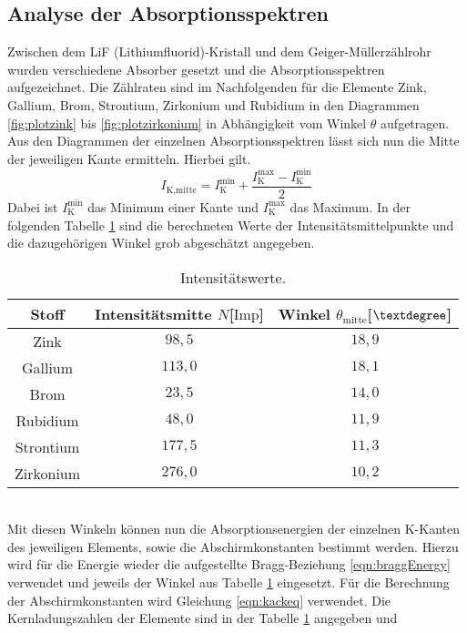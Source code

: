 \subsection{Analyse der Absorptionsspektren}
Zwischen dem LiF (Lithiumfluorid)-Kristall und dem Geiger-Müllerzählrohr wurden verschiedene Absorber gesetzt und die Absorptionsspektren aufgezeichnet.
Die Zählraten sind im Nachfolgenden für die Elemente Zink, Gallium, Brom, Strontium, Zirkonium und Rubidium in den Diagrammen \ref{fig:plotzink} bis \ref{fig:plotzirkonium} in Abhängigkeit vom 
Winkel $\theta$ aufgetragen.
Aus den Diagrammen der einzelnen Absorptionsspektren lässt sich nun die Mitte der jeweiligen Kante ermitteln.
Hierbei gilt.
\begin{equation*}
I_{\text{K,mitte}} = I_{\text{K}}^{\text{min}} + \frac{I_{\text{K}}^{\text{max}} - I_{\text{K}}^{\text{min}}}{2}
\end{equation*}
Dabei ist $I_{\text{K}}^{\text{min}}$ das Minimum einer Kante und $I_{\text{K}}^{\text{max}}$ das Maximum.
In der folgenden Tabelle \ref{tab:whatever} sind die berechneten Werte der Intensitätsmittelpunkte und die dazugehörigen Winkel grob abgeschätzt angegeben.
\begin{table}
\centering
\caption{Intensitätswerte.}
\label{tab:whatever}
\begin{tabular}{c c c}
    \toprule
    Stoff & Intensitätsmitte $N$[$\text{Imp}$] & Winkel $\theta_{\text{mitte}}$[$\textdegree$]\\
    \midrule
    Zink       &  $98{,5}$ & $18{,}9$ \\
    Gallium    &  $113{,}0$ & $18{,}1$ \\
    Brom          & $23{,}5$ & $14{,}0$ \\
     Rubidium     & $48{,}0$ & $11{,}9$ \\
      Strontium   & $177{,}5$ & $11{,}3$ \\
       Zirkonium  & $276{,}0$ & $10{,}2$ \\
    \bottomrule
\end{tabular}
\end{table}
\\
\newline %
Mit diesen Winkeln können nun die Absorptionsenergien der einzelnen K-Kanten des jeweiligen Elements, sowie die Abschirmkonstanten bestimmt werden.
Hierzu wird für die Energie wieder die aufgestellte Bragg-Beziehung \eqref{eqn:braggEnergy} verwendet und jeweils der Winkel aus Tabelle \ref{tab:whatever}
eingesetzt. Für die Berechnung der Abschirmkonstanten wird Gleichung \eqref{eqn:kackeq} verwendet. Die Kernladungszahlen der Elemente sind in der Tabelle \ref{tab:whatever} angegeben und
